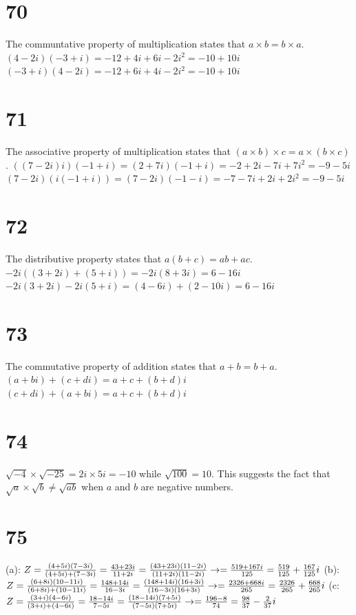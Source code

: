 \documentclass{article}
\theoremstyle{definition}
\begin{document}
\section*{70}
The communtative property of multiplication states that $a\times b=b\times a$.\newline
$(4-2i)(-3+i)=-12+4i+6i-2i^2=-10+10i$\newline $(-3+i)(4-2i)=-12+6i+4i-2i^2=-10+10i$

\section*{71}
The associative property of multiplication states that $(a\times b)\times c=a\times (b\times c)$.\newline
$((7-2i)i)(-1+i)=(2+7i)(-1+i)=-2+2i-7i+7i^2=-9-5i$\newline $(7-2i)(i(-1+i))=(7-2i)(-1-i)=-7-7i+2i+2i^2=-9-5i$

\section*{72}
The distributive property states that $a(b+c)=ab+ac$.\newline
$-2i((3+2i)+(5+i))=-2i(8+3i)=6-16i$\newline $-2i(3+2i)-2i(5+i)=(4-6i)+(2-10i)=6-16i$

\section*{73}
The commutative property of addition states that $a+b=b+a$.\newline
$(a+bi)+(c+di)=a+c+(b+d)i$\newline $(c+di)+(a+bi)=a+c+(b+d)i$

\section*{74}
$\sqrt{-4}\times \sqrt{-25}=2i\times 5i=-10$ while $\sqrt{100} = 10$. This suggests the fact that $\sqrt{a}\times \sqrt{b}\ne \sqrt{ab}$ 
when $a$ and $b$ are negative numbers.

\section*{75}
(a): $Z=\frac{(4+5i)(7-3i)}{(4+5i)+(7-3i)}=\frac{43+23i}{11+2i}=\frac{(43+23i)(11-2i)}{(11+2i)(11-2i)}\newline\rightarrow =
\frac{519+167i}{125}=\frac{519}{125}+\frac{167}{125}i$\newline
(b): $Z=\frac{(6+8i)(10-11i)}{(6+8i)+(10-11i)}=\frac{148+14i}{16-3i}=\frac{(148+14i)(16+3i)}{(16-3i)(16+3i)}\newline\rightarrow =\frac 
{2326+668i}{265}=\frac{2326}{265}+\frac{668}{265}i$\newline
(c: $Z=\frac{(3+i)(4-6i)}{(3+i)+(4-6i)}=\frac{18-14i}{7-5i}=\frac{(18-14i)(7+5i)}{(7-5i)(7+5i)}\newline\rightarrow =\frac
{196-8}{74}=\frac{98}{37}-\frac{2}{37}i$
\end{document}
